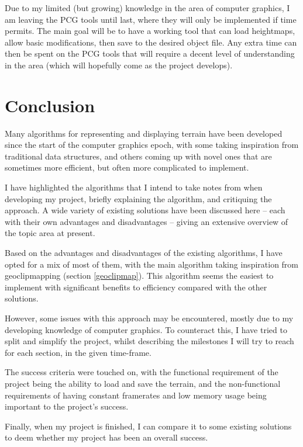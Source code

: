 \documentclass[notitlepage,12pt]{article}
\begin{document}
Due to my limited (but growing) knowledge in the area of computer graphics, I am leaving the PCG tools until last, where they will only be implemented if time permits. The main goal will be to have a working tool that can load heightmaps, allow basic modifications, then save to the desired object file. Any extra time can then be spent on the PCG tools that will require a decent level of understanding in the area (which will hopefully come as the project develops).

\section{Conclusion}

Many algorithms for representing and displaying terrain have been developed since the start of the computer graphics epoch, with some taking inspiration from traditional data structures, and others coming up with novel ones that are sometimes more efficient, but often more complicated to implement.

I have highlighted the algorithms that I intend to take notes from when developing my project, briefly explaining the algorithm, and critiquing the approach. A wide variety of existing solutions have been discussed here -- each with their own advantages and disadvantages -- giving an extensive overview of the topic area at present. 

Based on the advantages and disadvantages of the existing algorithms, I have opted for a mix of most of them, with the main algorithm taking inspiration from geoclipmapping (section \ref{geoclipmap}). This algorithm seems the easiest to implement with significant benefits to efficiency compared with the other solutions.

However, some issues with this approach may be encountered, mostly due to my developing knowledge of computer graphics. To counteract this, I have tried to split and simplify the project, whilst describing the milestones I will try to reach for each section, in the given time-frame.

The success criteria were touched on, with the functional requirement of the project being the ability to load and save the terrain, and the non-functional requirements of having constant framerates and low memory usage being important to the project's success.

Finally, when my project is finished, I can compare it to some existing solutions to deem whether my project has been an overall success.

\clearpage


\end{document}
